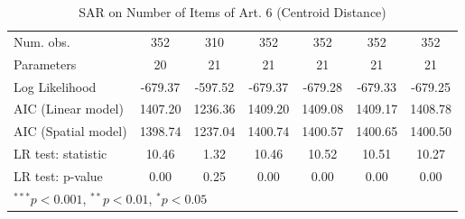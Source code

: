 \begin{table}[!h]
\begin{center}
\begin{tabular}{l c c c c c c }
Num. obs.               & 352           & 310           & 352           & 352           & 352          & 352           \\
Parameters              & 20            & 21            & 21            & 21            & 21           & 21            \\
Log Likelihood          & -679.37       & -597.52       & -679.37       & -679.28       & -679.33      & -679.25       \\
AIC (Linear model)      & 1407.20       & 1236.36       & 1409.20       & 1409.08       & 1409.17      & 1408.78       \\
AIC (Spatial model)     & 1398.74       & 1237.04       & 1400.74       & 1400.57       & 1400.65      & 1400.50       \\
LR test: statistic      & 10.46         & 1.32          & 10.46         & 10.52         & 10.51        & 10.27         \\
LR test: p-value        & 0.00          & 0.25          & 0.00          & 0.00          & 0.00         & 0.00          \\
\bottomrule
\multicolumn{7}{l}{\scriptsize{$^{***}p<0.001$, $^{**}p<0.01$, $^*p<0.05$}}
\end{tabular}
\caption{SAR on Number of Items of Art. 6 (Centroid Distance)}
\label{table:coefficients}
\end{center}
\end{table}

